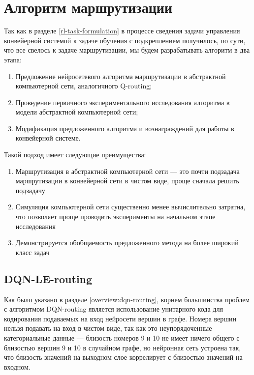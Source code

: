 \documentclass[specification,annotation,times]{itmo-student-thesis}
\theoremstyle{definition}
\begin{document}
\section{Алгоритм маршрутизации}

Так как в разделе \ref{rl-task-formulation} в процессе сведения задачи
управления конвейерной системой к задаче обучения с подкреплением получилось, по
сути, что все свелось к задаче маршрутизации, мы будем разрабатывать алгоритм в
два этапа:

\begin{enumerate}
\item Предложение нейросетевого алгоритма маршрутизации в абстрактной
  компьютерной сети, аналогичного Q-routing;
\item Проведение первичного экспериментального исследования алгоритма в модели
  абстрактной компьютерной сети;
\item Модификация предложенного алгоритма и вознаграждений для работы в
  конвейерной системе.
\end{enumerate}

Такой подход имеет следующие преимущества:

\begin{enumerate}
\item Маршрутизация в абстрактной компьютерной сети --- это почти подзадача
  маршрутизации в конвейерной сети в чистом виде, проще сначала решить подзадачу
\item Симуляция компьютерной сети существенно менее вычислительно затратна, что
  позволяет проще проводить эксперименты на начальном этапе исследования
\item Демонстрируется обобщаемость предложенного метода на более широкий класс
  задач
\end{enumerate}

\subsection{DQN-LE-routing}

Как было указано в разделе \ref{overview:dqn-routing}, корнем большинства проблем с алгоритмом
DQN-routing является использование унитарного кода для кодирования подаваемых на
вход нейросети вершин в графе. Номера вершин нельзя подавать на вход в чистом
виде, так как это неупорядоченные категориальные данные --- близость номеров 9 и
10 не имеет ничего общего с близостью вершин 9 и 10 в случайном графе, но
нейронная сеть устроена так, что близость значений на выходном слое коррелирует
с близостью значений на входном.
\end{document}
